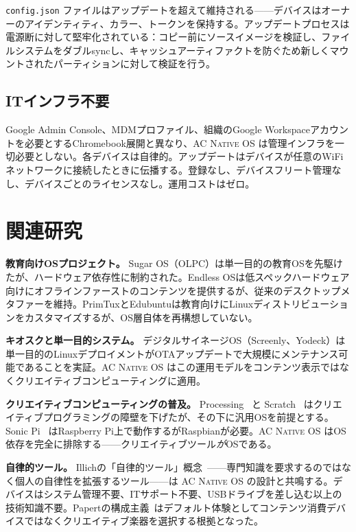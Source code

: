 \documentclass[10pt,letterpaper,twocolumn]{article}
\newcommand{\acos}{\textsc{AC Native OS}}
\begin{document}
\texttt{config.json} ファイルはアップデートを超えて維持される——デバイスはオーナーのアイデンティティ、カラー、トークンを保持する。アップデートプロセスは電源断に対して堅牢化されている：コピー前にソースイメージを検証し、ファイルシステムをダブルsyncし、キャッシュアーティファクトを防ぐため新しくマウントされたパーティションに対して検証を行う。

\subsection{ITインフラ不要}

Google Admin Console、MDMプロファイル、組織のGoogle Workspaceアカウントを必要とするChromebook展開と異なり、\acos{} は管理インフラを一切必要としない。各デバイスは自律的。アップデートはデバイスが任意のWiFiネットワークに接続したときに伝播する。登録なし、デバイスフリート管理なし、デバイスごとのライセンスなし。運用コストはゼロ。


\section{関連研究}
\label{sec:related}

\textbf{教育向けOSプロジェクト。} Sugar OS（OLPC）は単一目的の教育OSを先駆けたが、ハードウェア依存性に制約された。Endless OSは低スペックハードウェア向けにオフラインファーストのコンテンツを提供するが、従来のデスクトップメタファーを維持。PrimTuxとEdubuntuは教育向けにLinuxディストリビューションをカスタマイズするが、OS層自体を再構想していない。

\textbf{キオスクと単一目的システム。} デジタルサイネージOS（Screenly、Yodeck）は単一目的のLinuxデプロイメントがOTAアップデートで大規模にメンテナンス可能であることを実証。\acos{} はこの運用モデルをコンテンツ表示ではなくクリエイティブコンピューティングに適用。

\textbf{クリエイティブコンピューティングの普及。} Processing~\citep{reas2007processing} と Scratch~\citep{resnick2009scratch} はクリエイティブプログラミングの障壁を下げたが、その下に汎用OSを前提とする。Sonic Pi~\citep{aaron2016sonic} はRaspberry Pi上で動作するがRaspbianが必要。\acos{} はOS依存を完全に排除する——クリエイティブツール\emph{が}OSである。

\textbf{自律的ツール。} Illichの「自律的ツール」概念~\citep{illich1973tools}——専門知識を要求するのではなく個人の自律性を拡張するツール——は \acos{} の設計と共鳴する。デバイスはシステム管理不要、ITサポート不要、USBドライブを差し込む以上の技術知識不要。Papertの構成主義~\citep{papert1980mindstorms}はデフォルト体験としてコンテンツ消費デバイスではなくクリエイティブ楽器を選択する根拠となった。
\end{document}
